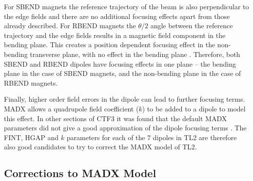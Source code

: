
For SBEND magnets the reference trajectory of the beam is also perpendicular to the edge fields and there are no additional focusing effects apart from those already described. For RBEND magnets the \(\theta/2\) angle between the reference trajectory and the edge fields results in a magnetic field component in the bending plane. This creates a position dependent focusing effect in the non-bending transverse plane, with no effect in the bending plane \cite{mackay}. Therefore, both SBEND and RBEND dipoles have focusing effects in one plane -- the bending plane in the case of SBEND magnets, and the non-bending plane in the case of RBEND magnets.

Finally, higher order field errors in the dipole can lead to further focusing terms. MADX allows a quadrupole field coefficient (\(k\)) to be added to a dipole to model this effect. In other sections of CTF3 it was found that the default MADX parameters did not give a good approximation of the dipole focusing terms \cite{benOptics}. The FINT, HGAP and \(k\) parameters for each of the 7 dipoles in TL2 are therefore also good candidates to try to correct the  MADX model of TL2.

\subsection{Corrections to MADX Model}
\label{ss:modelCorrections}

